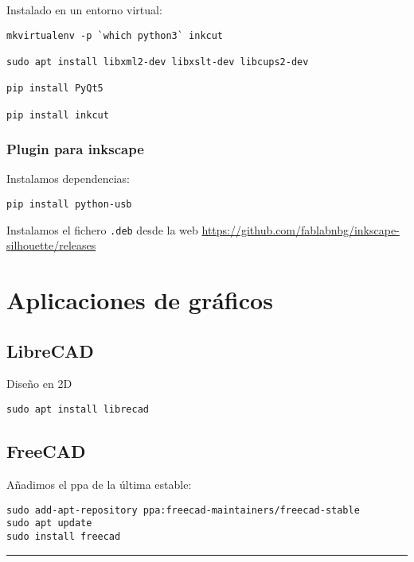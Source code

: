 \documentclass[
  12pt,
  spanish,
]{article}
\begin{document}
Instalado en un entorno virtual:

\begin{verbatim}
mkvirtualenv -p `which python3` inkcut

sudo apt install libxml2-dev libxslt-dev libcups2-dev

pip install PyQt5

pip install inkcut
\end{verbatim}

\hypertarget{plugin-para-inkscape}{%
\subsubsection{Plugin para inkscape}\label{plugin-para-inkscape}}

Instalamos dependencias:

\begin{verbatim}
pip install python-usb
\end{verbatim}

Instalamos el fichero \texttt{.deb} desde la web
\url{https://github.com/fablabnbg/inkscape-silhouette/releases}

\hypertarget{aplicaciones-de-gruxe1ficos}{%
\section{Aplicaciones de gráficos}\label{aplicaciones-de-gruxe1ficos}}

\hypertarget{librecad}{%
\subsection{LibreCAD}\label{librecad}}

Diseño en 2D

\begin{verbatim}
sudo apt install librecad
\end{verbatim}

\hypertarget{freecad}{%
\subsection{FreeCAD}\label{freecad}}

Añadimos el ppa de la última estable:

\begin{verbatim}
sudo add-apt-repository ppa:freecad-maintainers/freecad-stable
sudo apt update
sudo install freecad
\end{verbatim}

\begin{center}\rule{0.5\linewidth}{\linethickness}\end{center}
\end{document}
